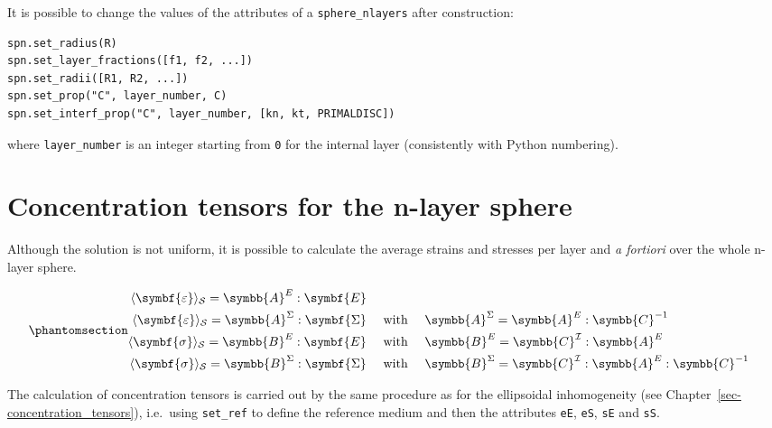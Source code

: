 \documentclass[
  a4paper,
  numbers=noendperiod,
  DIV=12]{scrreprt}
\newcommand{\uu}[1]{{\symbf{{#1}}}}
\newcommand{\uuuu}[1]{{\symbb{{#1}}}}
\newcommand{\eps}{{\uu{{\varepsilon}}}}
\newcommand{\E}{{\uu{{E}}}}
\newcommand{\sig}{{\uu{{\sigma}}}}
\newcommand{\Sig}{{\uu{{\Sigma}}}}
\begin{document}
It is possible to change the values of the attributes of a
\texttt{sphere\_nlayers} after construction:

\begin{verbatim}
spn.set_radius(R)
spn.set_layer_fractions([f1, f2, ...])
spn.set_radii([R1, R2, ...])
spn.set_prop("C", layer_number, C)
spn.set_interf_prop("C", layer_number, [kn, kt, PRIMALDISC])
\end{verbatim}

where \texttt{layer\_number} is an integer starting from \texttt{0} for
the internal layer (consistently with Python numbering).

\section{Concentration tensors for the n-layer
sphere}\label{sec-concentration-nlayers}

Although the solution is not uniform, it is possible to calculate the
average strains and stresses per layer and \emph{a fortiori} over the
whole n-layer sphere.

\begin{equation}\protect\phantomsection\label{eq-av-concentration}{
\begin{aligned}
    \langle\eps\rangle_{\mathcal{S}}=\uuuu{A}^E:\E&&\\
    \langle\eps\rangle_{\mathcal{S}}=\uuuu{A}^\Sigma:\Sig&\quad\textrm{ with }\quad \uuuu{A}^\Sigma=\uuuu{A}^E:\uuuu{C}^{-1}&\\
    \langle\sig\rangle_{\mathcal{S}}=\uuuu{B}^E:\E&\quad\textrm{ with }\quad \uuuu{B}^E=\uuuu{C}^\mathcal{I}:\uuuu{A}^E&\\
    \langle\sig\rangle_{\mathcal{S}}=\uuuu{B}^\Sigma:\Sig&\quad\textrm{ with }\quad \uuuu{B}^\Sigma=\uuuu{C}^\mathcal{I}:\uuuu{A}^E:\uuuu{C}^{-1}&
\end{aligned}
}\end{equation}

The calculation of concentration tensors is carried out by the same
procedure as for the ellipsoidal inhomogeneity (see
Chapter~\ref{sec-concentration_tensors}), i.e.~using \texttt{set\_ref}
to define the reference medium and then the attributes \texttt{eE},
\texttt{eS}, \texttt{sE} and \texttt{sS}.
\end{document}
